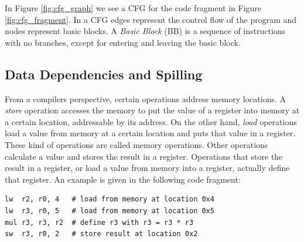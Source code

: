 In Figure \ref{fig:cfg_graph} we see a CFG for the code fragment in Figure \ref{fig:cfg_fragment}. In a CFG edges represent the control flow of the program and nodes represent basic blocks. A \emph{Basic Block} (BB) is a sequence of instructions with no branches, except for entering and leaving the basic block.





\subsection{Data Dependencies and Spilling}\label{sec:data_dependencies}
From a compilers perspective, certain operations address memory locations. A \emph{store} operation accesses the memory to put the value of a register into memory at a certain location, addressable by its address. On the other hand, \emph{load} operations load a value from memory at a certain location and puts that value in a register. These kind of operations are called memory operations. Other operations calculate a value and stores the result in a register. Operations that store the result in a register, or load a value from memory into a register, actually define that register. An example is given in the following code fragment:

\begin{lstlisting}
lw  r2, r0, 4   # load from memory at location 0x4
lw  r3, r0, 5   # load from memory at location 0x5
mul r3, r3, r2  # define r3 with r3 = r3 * r3
sw  r3, r0, 2   # store result at location 0x2
\end{lstlisting}


